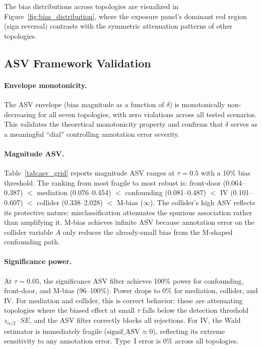 The bias distributions across topologies are visualized in Figure~\ref{fig:bias_distribution}, where the exposure panel's dominant red region (sign reversal) contrasts with the symmetric attenuation patterns of other topologies.

\subsection{ASV Framework Validation}
\label{sec:asv_results}

\paragraph{Envelope monotonicity.}
The ASV envelope (bias magnitude as a function of $\delta$) is monotonically non-decreasing for all seven topologies, with zero violations across all tested scenarios. This validates the theoretical monotonicity property and confirms that $\delta$ serves as a meaningful ``dial'' controlling annotation error severity.

\paragraph{Magnitude ASV.}
Table~\ref{tab:asv_grid} reports magnitude ASV ranges at $\tau{=}0.5$ with a 10\% bias threshold. The ranking from most fragile to most robust is: front-door (0.064--0.387) $<$ mediation (0.076--0.454) $<$ confounding (0.081--0.487) $<$ IV (0.101--0.607) $<$ collider (0.338--2.028) $<$ M-bias ($\infty$). The collider's high ASV reflects its protective nature: misclassification attenuates the spurious association rather than amplifying it. M-bias achieves infinite ASV because annotation error on the collider variable $A$ only reduces the already-small bias from the M-shaped confounding path.

\paragraph{Significance power.}
At $\tau{=}0.05$, the significance ASV filter achieves 100\% power for confounding, front-door, and M-bias (96--100\%). Power drops to 0\% for mediation, collider, and IV. For mediation and collider, this is correct behavior: these are attenuating topologies where the biased effect at small $\tau$ falls below the detection threshold $z_{\alpha/2} \cdot SE$, and the ASV filter correctly blocks all rejections. For IV, the Wald estimator is immediately fragile ($\text{signif\_ASV} \approx 0$), reflecting its extreme sensitivity to any annotation error. Type~I error is 0\% across all topologies.

